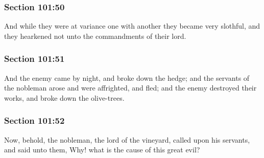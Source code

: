 	\subsubsection{Section 101:50} %
		\label{DC101-50}

		And while they were at variance one with another they became very slothful, and they hearkened not unto the commandments of their lord.


	\subsubsection{Section 101:51} %
		\label{DC101-51}

		And the enemy came by night, and broke down the hedge; and the servants of the nobleman arose and were affrighted, and fled; and the enemy destroyed their works, and broke down the olive-trees.


	\subsubsection{Section 101:52} %
		\label{DC101-52}

		Now, behold, the nobleman, the lord of the vineyard, called upon his servants, and said unto them, Why!  what is the cause of this great evil?


